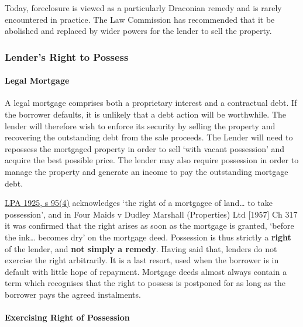 \documentclass[
]{article}
\begin{document}
Today, foreclosure is viewed as a particularly Draconian remedy and is
rarely encountered in practice. The Law Commission has recommended that
it be abolished and replaced by wider powers for the lender to sell the
property.

\hypertarget{lenders-right-to-possess}{%
\subsubsection{Lender's Right to
Possess}\label{lenders-right-to-possess}}

\hypertarget{legal-mortgage}{%
\paragraph{Legal Mortgage}\label{legal-mortgage}}

A legal mortgage comprises both a proprietary interest and a contractual
debt. If the borrower defaults, it is unlikely that a debt action will
be worthwhile. The lender will therefore wish to enforce its security by
selling the property and recovering the outstanding debt from the sale
proceeds. The Lender will need to repossess the mortgaged property in
order to sell `with vacant possession' and acquire the best possible
price. The lender may also require possession in order to manage the
property and generate an income to pay the outstanding mortgage debt.

\href{https://www.legislation.gov.uk/ukpga/Geo5/15-16/20/section/95}{LPA
1925, s 95(4)} acknowledges `the right of a mortgagee of land\ldots{} to
take possession', and in Four Maids v Dudley Marshall (Properties) Ltd
{[}1957{]} Ch 317 it was confirmed that the right arises as soon as the
mortgage is granted, `before the ink\ldots{} becomes dry' on the
mortgage deed. Possession is thus strictly a \textbf{right} of the
lender, and \textbf{not simply a remedy}. Having said that, lenders do
not exercise the right arbitrarily. It is a last resort, used when the
borrower is in default with little hope of repayment. Mortgage deeds
almost always contain a term which recognises that the right to possess
is postponed for as long as the borrower pays the agreed instalments.

\hypertarget{exercising-right-of-possession}{%
\paragraph{Exercising Right of
Possession}\label{exercising-right-of-possession}}
\end{document}
